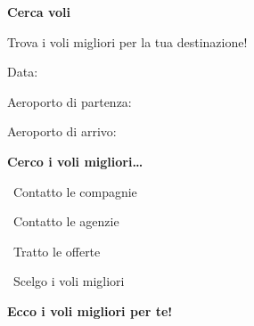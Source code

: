 \begin{center}
\begin{minipage}[t]{0.25\linewidth}
  \begin{tcolorbox}[schermo]
    \textbf{Cerca voli}\par
    Trova i voli migliori per la tua destinazione!\par\medskip
    Data:\par\campo[2.6cm]{\phantom{0}}\par
    Aeroporto di partenza:\par\campo[2.6cm]{\phantom{0}}\par
    Aeroporto di arrivo:\par\campo[2.6cm]{\phantom{0}}\par\medskip
    {\centering{}\par}
  \end{tcolorbox}
\end{minipage}\hspace{0.02\linewidth}\raisebox{-2.2cm}{\Large\textcolor{swteal}{$\Rightarrow$}}\hspace{0.02\linewidth}%
\begin{minipage}[t]{0.25\linewidth}
  \begin{tcolorbox}[schermo, colback=swblue!85, fontupper=\tiny\Lato\color{white}]
    \vspace*{1.1cm}
    {\centering\textbf{Cerco i voli migliori\ldots}\par}\medskip
    \textbullet\ Contatto le compagnie\par
    \textbullet\ Contatto le agenzie\par
    \textbullet\ Tratto le offerte\par
    \textbullet\ Scelgo i voli migliori
  \end{tcolorbox}
\end{minipage}\hspace{0.02\linewidth}\raisebox{-2.2cm}{\Large\textcolor{swteal}{$\Rightarrow$}}\hspace{0.02\linewidth}%
\begin{minipage}[t]{0.25\linewidth}
  \begin{tcolorbox}[schermo]
    \textbf{Ecco i voli migliori per te!}\par\medskip

\end{tcolorbox}
\end{minipage}
\end{center}
